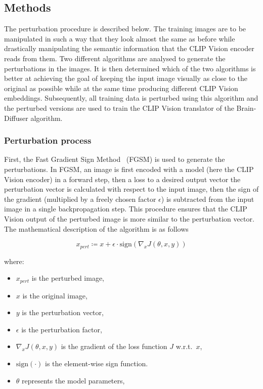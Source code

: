 \subsection{Methods}

The perturbation procedure is described below. The training images are to be manipulated in such a way that they look almost the same as before while drastically manipulating the semantic information that the CLIP Vision encoder reads from them. Two different algorithms are analysed to generate the perturbations in the images. It is then determined which of the two algorithms is better at achieving the goal of keeping the input image visually as close to the original as possible while at the same time producing different CLIP Vision embeddings. Subsequently, all training data is perturbed using this algorithm and the perturbed versions are used to train the CLIP Vision translator of the Brain-Diffuser algorithm.

\subsubsection{Perturbation process}

First, the Fast Gradient Sign Method~\cite{goodfellowExplainingHarnessingAdversarial2014} (FGSM) is used to generate the perturbations. In FGSM, an image is first encoded with a model (here the CLIP Vision encoder) in a forward step, then a loss to a desired output vector the perturbation vector is calculated with respect to the input image, then the sign of the gradient (multiplied by a freely chosen factor $\epsilon$) is subtracted from the input image in a single backpropagation step. This procedure ensures that the CLIP Vision output of the perturbed image is more similar to the perturbation vector. The mathematical description of the algorithm is as follows

\[
x_{pert} \coloneq x + \epsilon \cdot \text{sign}(\nabla_x J(\theta, x, y))
\]

where:
\begin{itemize}
    \item \( x_{pert} \) is the perturbed image,
    \item \( x \) is the original image,
    \item \( y \) is the perturbation vector,
    \item \( \epsilon \) is the perturbation factor,
    \item \( \nabla_x J(\theta, x, y) \) is the gradient of the loss function \( J \) w.r.t.\ \( x \),
    \item \( \text{sign}(\cdot) \) is the element-wise sign function.
    \item \( \theta \) represents the model parameters,
\end{itemize}

